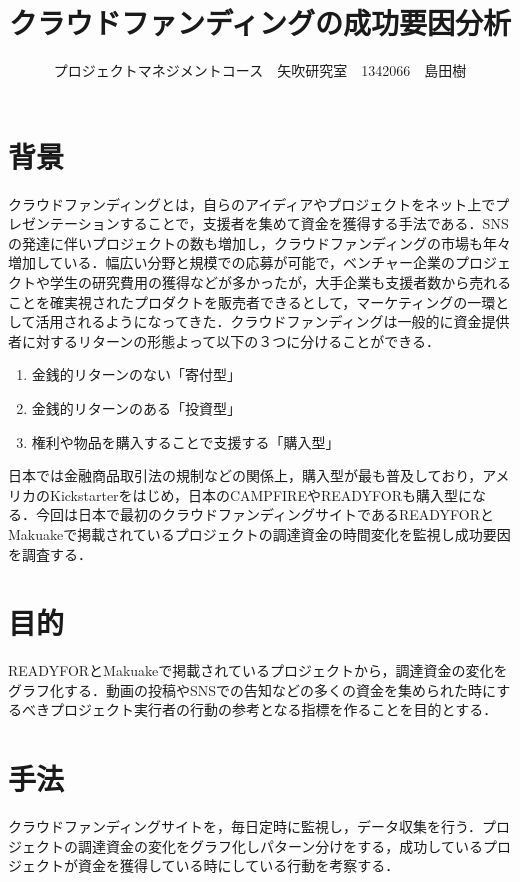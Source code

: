 \documentclass[uplatex,twocolumn,dvipdfmx]{jsarticle}
\title{\vspace{-5mm}\fontsize{14pt}{0pt}\selectfont クラウドファンディングの成功要因分析}
\author{\normalsize プロジェクトマネジメントコース　矢吹研究室　1342066　島田樹}
\date{}
\begin{document}
\fontsize{10.5pt}{\baselineskip}\selectfont
\maketitle





\section{背景}
クラウドファンディング\cite{wiki}とは，自らのアイディアやプロジェクトをネット上でプレゼンテーションすることで，支援者を集めて資金を獲得する手法である．SNSの発達に伴いプロジェクトの数も増加し，クラウドファンディングの市場も年々増加している\cite{visualizing}．幅広い分野と規模での応募が可能で，ベンチャー企業のプロジェクトや学生の研究費用の獲得などが多かったが，大手企業も支援者数から売れることを確実視されたプロダクトを販売者できるとして，マーケティングの一環として活用されるようになってきた．クラウドファンディングは一般的に資金提供者に対するリターンの形態よって以下の３つに分けることができる\cite{crwowd}．
\begin{enumerate}
 \item 金銭的リターンのない「寄付型」
 \item 金銭的リターンのある「投資型」
 \item 権利や物品を購入することで支援する「購入型」
\end{enumerate}

日本では金融商品取引法の規制などの関係上，購入型が最も普及しており\cite{keizai}，アメリカのKickstarterをはじめ，日本のCAMPFIREやREADYFORも購入型になる．今回は日本で最初のクラウドファンディングサイトであるREADYFORとMakuakeで掲載されているプロジェクトの調達資金の時間変化を監視し成功要因を調査する．


\section{目的}
READYFORとMakuakeで掲載されているプロジェクトから，調達資金の変化をグラフ化する．動画の投稿やSNSでの告知などの多くの資金を集められた時にするべきプロジェクト実行者の行動の参考となる指標を作ることを目的とする．


\section{手法}
クラウドファンディングサイトを，毎日定時に監視し，データ収集を行う．プロジェクトの調達資金の変化をグラフ化しパターン分けをする，成功しているプロジェクトが資金を獲得している時にしている行動を考察する．
\end{document}
